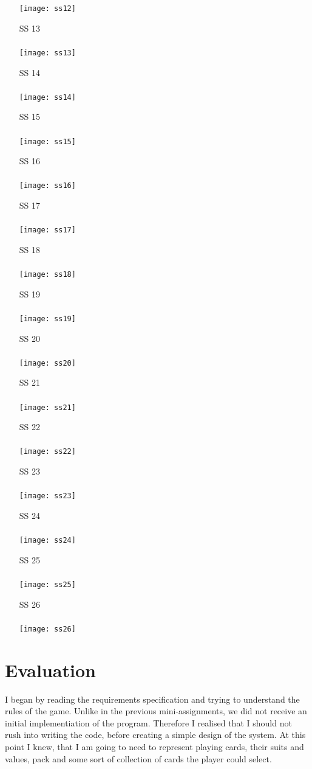 \documentclass[a4paper, 11pt, titlepage]{article}
\begin{document}
\begin{enumerate}
		\texttt{[image: ss12]} \newpage
	\item[SS]13\\\\ 
		\texttt{[image: ss13]}
	\item[SS]14\\\\ 
		\texttt{[image: ss14]} \newpage
	\item[SS]15\\\\ 
		\texttt{[image: ss15]}
	\item[SS]16\\\\ 
		\texttt{[image: ss16]} \newpage
	\item[SS]17\\\\ 
		\texttt{[image: ss17]}
	\item[SS]18\\\\ 
		\texttt{[image: ss18]} \newpage
	\item[SS]19\\\\ 
		\texttt{[image: ss19]}
	\item[SS]20\\\\ 
		\texttt{[image: ss20]} \newpage
	\item[SS]21\\\\ 
		\texttt{[image: ss21]}
	\item[SS]22\\\\ 
		\texttt{[image: ss22]} \newpage
	\item[SS]23\\\\ 
		\texttt{[image: ss23]}
	\item[SS]24\\\\ 
		\texttt{[image: ss24]} \newpage
	\item[SS]25\\\\ 
		\texttt{[image: ss25]}
	\item[SS]26\\\\ 
		\texttt{[image: ss26]}		
\end{enumerate}
\section{Evaluation}
I began by reading the requirements specification and trying to understand the rules
of the game. Unlike in the previous mini-assignments, we did not receive an initial 
implementiation of the program. Therefore I realised that I should not rush into 
writing the code, before creating a simple design of the system. At this point I knew,
that I am going to need to represent playing cards, their suits and values, pack and 
some sort of collection of cards the player could select. 
\end{document}

